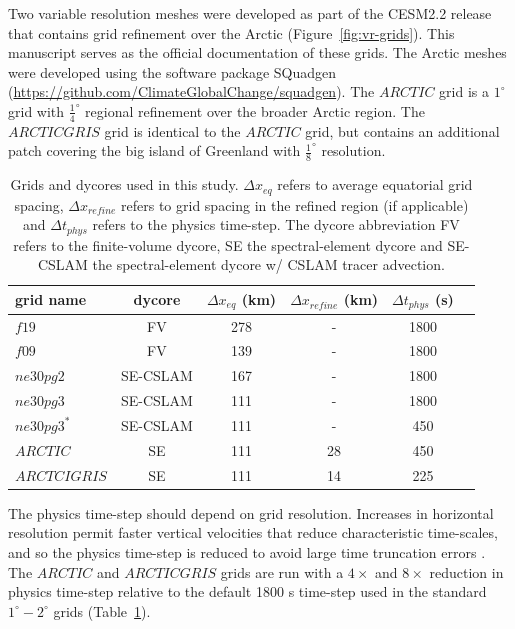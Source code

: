 \documentclass[draft]{agujournal2019}
\begin{document}
Two variable resolution meshes were developed as part of the CESM2.2 release that contains grid refinement over the Arctic (Figure~\ref{fig:vr-grids}). This manuscript serves as the official documentation of these grids. The Arctic meshes were developed using the software package SQuadgen (\url{https://github.com/ClimateGlobalChange/squadgen}). The $ARCTIC$ grid is a $1^{\circ}$ grid with $\frac{1}{4}^{\circ}$ regional refinement over the broader Arctic region. The $ARCTICGRIS$ grid is identical to the $ARCTIC$ grid, but contains an additional patch covering the big island of Greenland with $\frac{1}{8}^{\circ}$ resolution.

 \begin{table}
 \centering
 \scriptsize
 \begin{tabular}{lccccc}
   \hline
   grid name & dycore & $\Delta x_{eq}$ (km) & $\Delta x_{refine}$ (km) & $\Delta t_{phys}$ (s) \\ 
   \hline
   $f19$ & FV & 278 & - &1800 \\
   $f09$ & FV & 139 & - &1800 \\
   $ne30pg2$ & SE-CSLAM & 167 & - & 1800 \\
   $ne30pg3$ & SE-CSLAM & 111 & - & 1800 \\
   $ne30pg3^{*}$ & SE-CSLAM & 111 & - & 450 \\
   $ARCTIC$ & SE & 111 & 28 & 450 \\
   $ARCTCIGRIS$ & SE & 111 & 14 & 225 \\
 \hline
 \end{tabular}
  \caption{Grids and dycores used in this study. $\Delta x_{eq}$ refers to average equatorial grid spacing, $\Delta x_{refine}$ refers to grid spacing in the refined region (if applicable) and $\Delta t_{phys}$ refers to the physics time-step. The dycore abbreviation FV refers to the finite-volume dycore, SE the spectral-element dycore and SE-CSLAM the spectral-element dycore w/ CSLAM tracer advection.}
 \label{tbl:table1}
 \end{table}

The physics time-step should depend on grid resolution. Increases in horizontal resolution permit faster vertical velocities that reduce characteristic time-scales, and so the physics time-step is reduced to avoid large time truncation errors \cite{HR2018JAMES}. The $ARCTIC$ and $ARCTICGRIS$ grids are run with a $4\times$ and $8\times$ reduction in physics time-step relative to the default 1800 s time-step used in the standard $1^{\circ}-2^{\circ}$ grids (Table~\ref{tbl:table1}).
\end{document}
